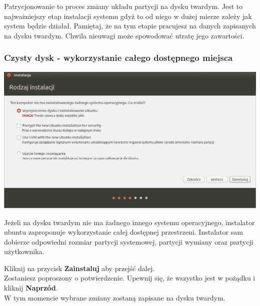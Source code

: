 \label{subsec:partycjonowanie}
Patrycjonowanie to proces zmiany układu partycji na dysku twardym. Jest to najważniejszy etap instalacji systemu gdyż to od niego w dużej mierze zależy jak system będzie działał. Pamiętaj, że na tym etapie pracujesz na danych zapisanych na dysku twardym. Chwila nieuwagi może spowodować utratę jego zawartości.

\subsubsection{Czysty dysk - wykorzystanie całego dostępnego miejsca}
\begin{center}
	\includegraphics[scale=0.5]{images/instalator_partycjonowanie_proste.png}
\end{center}

Jeżeli na dysku twardym nie ma żadnego innego systemu operacyjnego, instalator ubuntu zaproponuje wykorzystanie całej dostępnej przestrzeni. Instalator sam dobierze odpowiedni rozmiar partycji systemowej, partycji wymiany oraz partycji użytkownika.
\begin{flushright}
Kliknij na przycisk \textbf{Zainstaluj} aby przejść dalej.\\
Zostaniesz poproszony o potwierdzenie. Upewnij się, że wszystko jest w pożądku i kliknij \textbf{Naprzód}.\\
W tym momencie wybrane zmiany zostaną zapisane na dysku twardym.
\end{flushright}
\clearpage


